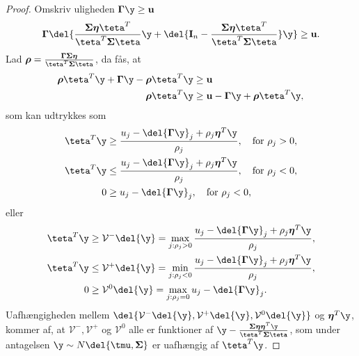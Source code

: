 \begin{proof}
Omskriv uligheden \(\boldsymbol{\Gamma} \y \geq \mathbf{u}\)
\begin{align*}
\boldsymbol{\Gamma} \del{ \frac{\boldsymbol{\Sigma} \boldsymbol{\eta} \teta^T}{\teta^T \boldsymbol{\Sigma} \teta} \y + \del{\mathbf{I}_n - \frac{\boldsymbol{\Sigma}\boldsymbol{\eta} \teta^T}{\teta^T \boldsymbol{\Sigma} \teta}} \y} \geq \mathbf{u}.
\end{align*}
Lad \(\boldsymbol{\rho} = \frac{\boldsymbol{\Gamma} \boldsymbol{\Sigma} \boldsymbol{\eta}}{\teta^T \boldsymbol{\Sigma} \teta}\), da fås, at
\begin{align*}
\boldsymbol{\rho} \teta^T \y + \boldsymbol{\Gamma} \y - \boldsymbol{\rho} \teta^T \y &\geq \mathbf{u} \\
\boldsymbol{\rho} \teta^T \y &\geq \mathbf{u} - \boldsymbol{\Gamma} \y + \boldsymbol{\rho} \teta^T \y,
\end{align*}
som kan udtrykkes som
\begin{align*}
\teta^T \y & \geq \frac{u_j - \del{\boldsymbol{\Gamma} \y}_j + \rho_j \boldsymbol{\eta}^T \y}{\rho_j}, \quad \text{for } \rho_j > 0, \\
\teta^T \y & \leq \frac{u_j - \del{\boldsymbol{\Gamma} \y}_j + \rho_j \boldsymbol{\eta}^T \y}{\rho_j}, \quad \text{for } \rho_j < 0, \\
0 &\geq u_j - \del{\boldsymbol{\Gamma} \y}_j, \quad \text{for } \rho_j < 0,
\end{align*}
eller
\begin{align*}
\teta^T \y & \geq \mathcal{V}^- \del{\y} = \max_{j: \rho_j > 0} \frac{u_j - \del{\boldsymbol{\Gamma} \y}_j + \rho_j \boldsymbol{\eta}^T \y}{\rho_j},\\
\teta^T \y & \leq \mathcal{V}^+ \del{\y} = \min_{j: \rho_j < 0} \frac{u_j - \del{\boldsymbol{\Gamma} \y}_j + \rho_j \boldsymbol{\eta}^T \y}{\rho_j}, \\
0 &\geq \mathcal{V}^0 \del{\y} = \max_{j: \rho_j = 0} u_j - \del{\boldsymbol{\Gamma} \y}_j.
\end{align*}
Uafhængigheden mellem \(\del{\mathcal{V}^-\del{\y}, \mathcal{V}^+\del{\y},\mathcal{V}^0\del{\y}}\) og \(\boldsymbol{\eta}^T \y\), kommer af, at \(\mathcal{V}^-, \mathcal{V}^+\) og \(\mathcal{V}^0\) alle er funktioner af \(\y - \frac{ \boldsymbol{\Sigma} \boldsymbol{\eta} \boldsymbol{\eta}^T \y}{\teta^T \boldsymbol{\Sigma} \teta} \), som under antagelsen \(\y \sim N \del{\tmu,  \boldsymbol{\Sigma}}\) er uafhængig af \(\teta^T \y\).
\end{proof}

